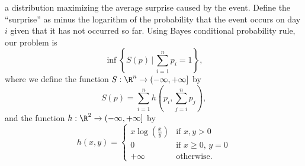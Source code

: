 \documentclass[../borwein-lewis_notes.tex]{subfiles}
\begin{document}
a distribution maximizing the average surprise caused by the event. 
Define the ``surprise'' as minus the logarithm of the probability that 
the event occurs on day $i$ given that it has not occurred so far. Using 
Bayes conditional probability rule, our problem is 
\begin{equation*}
\inf\left\{S(p)\,\bigg|\,\sum_{i=1}^n p_i=1\right\},
\end{equation*}
where we define the function $S:\R^n\to (-\infty,+\infty]$ by 
\begin{equation*}
S(p) = \sum_{i=1}^n h\left(p_i, \sum_{j=i}^n p_j\right),
\end{equation*}
and the function $h:\R^2\to(-\infty,+\infty]$ by 
\begin{equation*}
h(x,y) = \begin{cases} x\log\left(\frac{x}{y}\right) &\text{if }x,y>0\\
0 &\text{if }x\geq 0,\,y=0\\
+\infty&\text{otherwise.}\end{cases}
\end{equation*}
\end{document}
